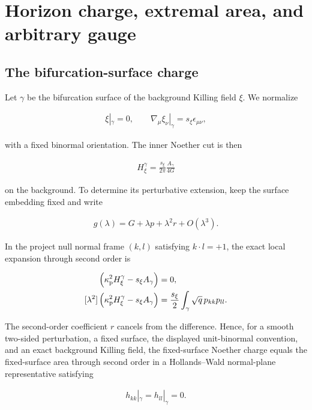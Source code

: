 \section{Horizon charge, extremal area, and arbitrary gauge}\label{sec:horizon-identity}

\subsection{The bifurcation-surface charge}\label{subsec:bifurcation-charge}

Let $\gamma$ be the bifurcation surface of the background Killing field $\xi$. We normalize

\begin{align}
\xi|_\gamma=0,
\qquad
\nabla_\mu\xi_\nu|_\gamma=s_\xi\epsilon_{\mu\nu},
\end{align}

with a fixed binormal orientation. The inner Noether cut is then

\begin{align}
H_\xi^\gamma
=\frac{s_\xi}{2\pi}\frac{A_\gamma}{4G}
\end{align}

on the background. To determine its perturbative extension, keep the surface embedding fixed and write

\begin{align}
g(\lambda)=G+\lambda p+\lambda^2r+O(\lambda^3).
\end{align}

In the project null normal frame $(k,l)$ satisfying $k\cdot l=+1$, the exact local expansion through second order is

\begin{align}
[\lambda]\left(\kappa_{\rm p}^{2}H_\xi^\gamma-s_\xi A_\gamma\right)&=0,\\
[\lambda^2]\left(\kappa_{\rm p}^{2}H_\xi^\gamma-s_\xi A_\gamma\right)
&=\frac{s_\xi}{2}
\int_\gamma\sqrt q\,p_{kk}p_{ll}. \label{eq:fixed-surface-obstruction}
\end{align}

The second-order coefficient $r$ cancels from the difference. Hence, for a smooth two-sided perturbation, a fixed surface, the displayed unit-binormal convention, and an exact background Killing field, the fixed-surface Noether charge equals the fixed-surface area through second order in a Hollands--Wald normal-plane representative satisfying

\begin{align}
h_{kk}|_\gamma=h_{ll}|_\gamma=0. \label{eq:hw-normal}
\end{align}

